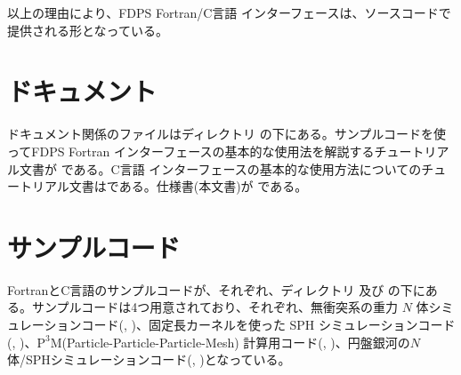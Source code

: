 以上の理由により、FDPS Fortran/C言語 インターフェースは、ソースコードで提供される形となっている。

\section{ドキュメント}
ドキュメント関係のファイルはディレクトリ  の下にある。サンプルコードを使ってFDPS Fortran インターフェースの基本的な使用法を解説するチュートリアル文書が  である。C言語 インターフェースの基本的な使用方法についてのチュートリアル文書はである。仕様書(本文書)が  である。

\section{サンプルコード}
\label{sec:sample_codes}
FortranとC言語のサンプルコードが、それぞれ、ディレクトリ  及び  の下にある。サンプルコードは4つ用意されており、それぞれ、無衝突系の重力 $N$ 体シミュレーションコード(, )、固定長カーネルを使った SPH シミュレーションコード(, )、$\mathrm{P^{3}M}$(Particle-Particle-Particle-Mesh) 計算用コード(, )、円盤銀河の$N$体/SPHシミュレーションコード(, )となっている。
